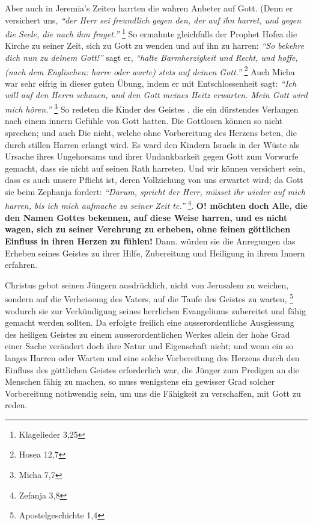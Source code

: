 \medskip

Aber auch in Jeremia’s  Zeiten harrten die wahren
Anbeter auf Gott. (Denn er
versichert uns,
\textit{ "`der Herr sei freundlich gegen den, der auf ihn harret, und
gegen die Seele, die nach ihm fraget."'}
\footnote{Klagelieder 3,25}
So ermahnte
gleichfalls der Prophet Hofea  die Kirche zu seiner Zeit,
sich zu Gott zu wenden
und auf ihn zu harren:
\textit{"`So bekehre dich nun zu deinem Gott!"'} sagt er,
\textit{"`halte
Barmherzigkeit und Recht, und hoffe, (nach dem Englischen: harre oder warte)
stets auf deinen Gott."'}
\footnote{Hosea 12,7}
Auch Micha  war sehr eifrig in
dieser guten Übung, indem er mit Entschlossenheit sagt:
\textit{"`Ich will auf den
Herrn schauen, und den Gott meines Heitz erwarten. Mein Gott wird mich
hören."'}
\footnote{Micha 7,7}
So redeten die Kinder des Geistes , die ein
dürstendes Verlangen nach einem innern Gefühle von Gott hatten. Die Gottlosen
können so nicht sprechen; und auch Die nicht, welche ohne Vorbereitung des
Herzens beten, die durch stillen Harren erlangt wird. Es ward den Kindern
Israels  in der Wüste als Ursache ihres Ungehorsams und ihrer Undankbarkeit
gegen Gott zum Vorwurfe gemacht, dass sie nicht auf seinen Rath harreten. Und
wir können versichert sein, dass es auch unsere Pflicht ist, deren Vollziehung
von uns erwartet wird; da Gott sie beim Zephanja 
 fordert:
\textit{"`Darum, spricht
der Herr, müsset ihr wieder auf mich harren, bis ich mich aufmache zu seiner
Zeit tc."'}
\footnote{Zefanja 3,8}.
\textbf{O! möchten doch Alle, die den Namen
Gottes
bekennen, auf diese Weise harren, und es nicht wagen, sich zu seiner Verehrung
zu erheben, ohne feinen göttlichen Einfluss in ihren Herzen zu fühlen!} Dann.
würden sie die Anregungen das Erheben seines Geistes zu ihrer Hilfe, Zubereitung
und Heiligung in ihrem Innern erfahren.

\medskip
Christus gebot seinen Jüngern ausdrücklich, nicht von Jerusalem
 zu weichen,
sondern auf die Verheissung des Vaters, auf die Taufe des Geistes  zu
warten,
\footnote{Apostelgeschichte 1,4}
wodurch sie zur Verkündigung  seines herrlichen
Evangeliums zubereitet und fähig gemacht werden sollten. Da erfolgte freilich
eine ausserordentliche Ausgiessung  des heiligen Geistes zu
einem
ausserordentlichen Werkes allein der hohe Grad einer Sache verändert doch ihre
Natur und Eigenschaft nicht; und wenn ein so langes Harren oder Warten und eine
solche Vorbereitung des Herzens durch den Einfluss des göttlichen Geistes
erforderlich war, die Jünger zum Predigen an die Menschen fähig zu machen, so
muss wenigstens ein gewisser Grad solcher Vorbereitung nothwendig sein, um uns
die Fähigkeit zu verschaffen, mit Gott zu reden.

